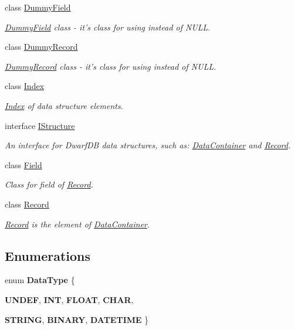 \begin{DoxyCompactItemize}
class \hyperlink{class_dwarf_d_b_1_1_data_structures_1_1_dummy_field}{DummyField}
\begin{DoxyCompactList}\small\item\em \hyperlink{class_dwarf_d_b_1_1_data_structures_1_1_dummy_field}{DummyField} class -\/ it's class for using instead of NULL. \item\end{DoxyCompactList}\item 
class \hyperlink{class_dwarf_d_b_1_1_data_structures_1_1_dummy_record}{DummyRecord}
\begin{DoxyCompactList}\small\item\em \hyperlink{class_dwarf_d_b_1_1_data_structures_1_1_dummy_record}{DummyRecord} class -\/ it's class for using instead of NULL. \item\end{DoxyCompactList}\item 
class \hyperlink{class_dwarf_d_b_1_1_data_structures_1_1_index}{Index}
\begin{DoxyCompactList}\small\item\em \hyperlink{class_dwarf_d_b_1_1_data_structures_1_1_index}{Index} of data structure elements. \item\end{DoxyCompactList}\item 
interface \hyperlink{interface_dwarf_d_b_1_1_data_structures_1_1_i_structure}{IStructure}
\begin{DoxyCompactList}\small\item\em An interface for DwarfDB data structures, such as: \hyperlink{class_dwarf_d_b_1_1_data_structures_1_1_data_container}{DataContainer} and \hyperlink{class_dwarf_d_b_1_1_data_structures_1_1_record}{Record}. \item\end{DoxyCompactList}\item 
class \hyperlink{class_dwarf_d_b_1_1_data_structures_1_1_field}{Field}
\begin{DoxyCompactList}\small\item\em Class for field of \hyperlink{class_dwarf_d_b_1_1_data_structures_1_1_record}{Record}. \item\end{DoxyCompactList}\item 
class \hyperlink{class_dwarf_d_b_1_1_data_structures_1_1_record}{Record}
\begin{DoxyCompactList}\small\item\em \hyperlink{class_dwarf_d_b_1_1_data_structures_1_1_record}{Record} is the element of \hyperlink{class_dwarf_d_b_1_1_data_structures_1_1_data_container}{DataContainer}. \item\end{DoxyCompactList}\end{DoxyCompactItemize}
\subsection*{Enumerations}
\begin{DoxyCompactItemize}
\item 
enum {\bfseries DataType} \{ \par
{\bfseries UNDEF}, 
{\bfseries INT}, 
{\bfseries FLOAT}, 
{\bfseries CHAR}, 
\par
{\bfseries STRING}, 
{\bfseries BINARY}, 
{\bfseries DATETIME}
 \}
\end{DoxyCompactItemize}

